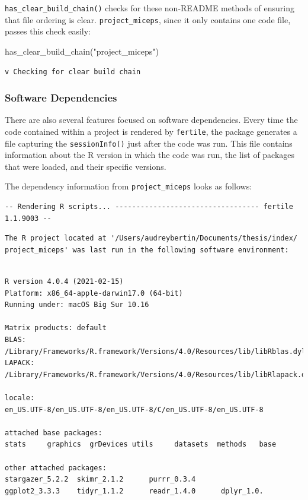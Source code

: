 \documentclass[12pt,twoside]{reedthesis}
\newenvironment{Shaded}{\begin{snugshade}}{\end{snugshade}}
\newcommand{\FunctionTok}[1]{\textcolor[rgb]{0.00,0.00,0.00}{#1}}
\newcommand{\NormalTok}[1]{#1}
\newcommand{\StringTok}[1]{\textcolor[rgb]{0.31,0.60,0.02}{#1}}
\begin{document}
\texttt{has\_clear\_build\_chain()} checks for these non-README methods of ensuring that file ordering is clear. \texttt{project\_miceps}, since it only contains one code file, passes this check easily:
\begin{Shaded}
\begin{Highlighting}[]
\FunctionTok{has\_clear\_build\_chain}\NormalTok{(}\StringTok{"project\_miceps"}\NormalTok{)}
\end{Highlighting}
\end{Shaded}
\begin{verbatim}
v Checking for clear build chain
\end{verbatim}
\hypertarget{software-dependencies}{%
\subsubsection{Software Dependencies}\label{software-dependencies}}

There are also several features focused on software dependencies. Every time the code contained within a project is rendered by \texttt{fertile}, the package generates a file capturing the \texttt{sessionInfo()} just after the code was run. This file contains information about the R version in which the code was run, the list of packages that were loaded, and their specific versions.

The dependency information from \texttt{project\_miceps} looks as follows:

\small
\begin{verbatim}
-- Rendering R scripts... ---------------------------------- fertile 1.1.9003 --
\end{verbatim}
\begin{verbatim}
The R project located at '/Users/audreybertin/Documents/thesis/index/
project_miceps' was last run in the following software environment:
\end{verbatim}
\begin{verbatim}

R version 4.0.4 (2021-02-15)
Platform: x86_64-apple-darwin17.0 (64-bit)
Running under: macOS Big Sur 10.16

Matrix products: default
BLAS:   /Library/Frameworks/R.framework/Versions/4.0/Resources/lib/libRblas.dylib
LAPACK: /Library/Frameworks/R.framework/Versions/4.0/Resources/lib/libRlapack.dylib

locale:
en_US.UTF-8/en_US.UTF-8/en_US.UTF-8/C/en_US.UTF-8/en_US.UTF-8

attached base packages:
stats     graphics  grDevices utils     datasets  methods   base     

other attached packages:
stargazer_5.2.2  skimr_2.1.2      purrr_0.3.4     
ggplot2_3.3.3    tidyr_1.1.2      readr_1.4.0      dplyr_1.0.
\end{verbatim}
\normalsize
\end{document}
